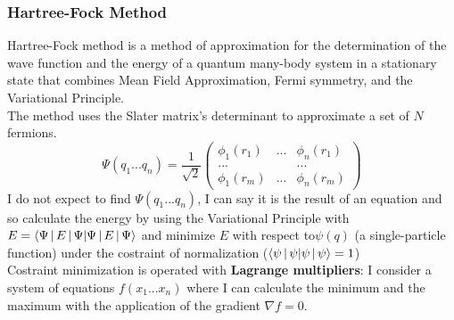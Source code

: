 \subsubsection{Hartree-Fock Method}
Hartree-Fock method is a method of approximation for the determination of the wave function and the energy of a quantum many-body system in a stationary state that combines Mean Field Approximation, Fermi symmetry, and the Variational Principle.\\
The method uses the Slater matrix's determinant to approximate a set of $N$ fermions.
\[
\Psi(q_1...q_n)=\frac{1}{\sqrt{2}}
\begin{pmatrix}
\phi_1(r_1)&...&\phi_n(r_1)\\
... & &...\\
\phi_1(r_m)&...&\phi_n(r_m)
\end{pmatrix}
\]
I do not expect to find $\Psi(q_1...q_n)$, I can say it is the result of an equation and so calculate the energy by using the Variational Principle with $E=\braket{\Psi\,|\,E\,|\,\Psi}$ and minimize $E$ with respect to$\psi(q)$ (a single-particle function) under the costraint of normalization ($\braket{\psi\,|\,\psi}=1$)\\
Costraint minimization is operated with \textbf{Lagrange multipliers}: I consider a system of equations $f(x_1...x_n)$ where I can calculate the minimum and the maximum with the application of the gradient $\nabla f=0$.\\

